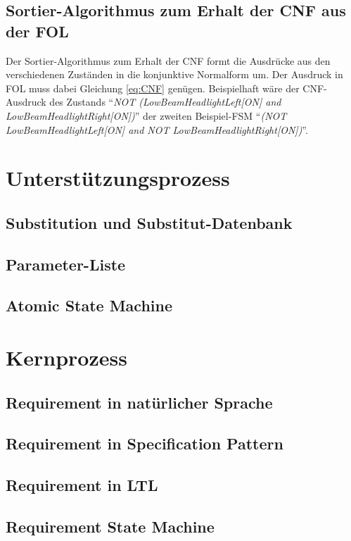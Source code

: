\subsection{Sortier-Algorithmus zum Erhalt der CNF aus der FOL}
\label{subsec:fol2cnf_sort_algo}
Der Sortier-Algorithmus zum Erhalt der CNF formt die Ausdrücke aus den verschiedenen Zuständen in die konjunktive Normalform um. Der Ausdruck in FOL muss dabei Gleichung \ref{eq:CNF} genügen.
Beispielhaft wäre der CNF-Ausdruck des Zustands "`\textit{NOT (LowBeamHeadlightLeft[ON] and LowBeamHeadlightRight[ON])}"' der zweiten Beispiel-FSM "`\textit{(NOT LowBeamHeadlightLeft[ON] and NOT LowBeamHeadlightRight[ON])}"'. 
\section{Unterstützungsprozess}
\label{sec:support_proc}
\subsection{Substitution und Substitut-Datenbank}
\label{subsec:substitution_database}
\subsection{Parameter-Liste}
\label{subsec:parameter_list}
\subsection{Atomic State Machine}
\label{subsec:ASM}
\section{Kernprozess}
\label{sec:core_proc}
\subsection{Requirement in natürlicher Sprache}
\label{subsec:req_NL}
\subsection{Requirement in Specification Pattern}
\label{subsec:req_SPS}
\subsection{Requirement in LTL}
\label{subsec:req_LTL}
\subsection{Requirement State Machine}
\label{subsec:RSM}
